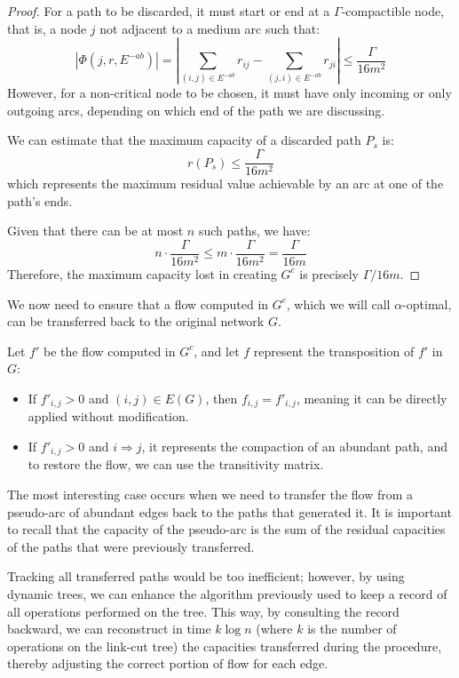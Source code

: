 \begin{proof}
    For a path to be discarded, it must start or end at a \(\Gamma\)-compactible node, that is, a node \( j \) not adjacent to a medium arc such that:
    \[
    |\Phi(j, r, E^{-ab})| = \left| \sum_{(i,j) \in E^{-ab}} r_{ij} - \sum_{(j,i) \in E^{-ab}} r_{ji} \right| \leq \frac{\Gamma}{16m^2}
    \]
    However, for a non-critical node to be chosen, it must have only incoming or only outgoing arcs, depending on which end of the path we are discussing.
    
    We can estimate that the maximum capacity of a discarded path \( P_s \) is:
    \[
    r(P_s) \leq \frac{\Gamma}{16m^2}
    \]
    which represents the maximum residual value achievable by an arc at one of the path's ends.
    
    Given that there can be at most \( n \) such paths, we have:
    \[
    n \cdot \frac{\Gamma}{16m^2} \leq m \cdot \frac{\Gamma}{16m^2} = \frac{\Gamma}{16m}
    \]
    Therefore, the maximum capacity lost in creating \( G^c \) is precisely \( \Gamma/16m \).
\end{proof}

We now need to ensure that a flow computed in \( G^c \), which we will call \(\alpha\)-optimal, can be transferred back to the original network \( G \).

Let \( f' \) be the flow computed in \( G^c \), and let \( f \) represent the transposition of \( f' \) in \( G \):
\begin{itemize}
    \item If \( f'_{i,j} > 0 \) and \( (i,j) \in E(G) \), then \( f_{i,j} = f'_{i,j} \), meaning it can be directly applied without modification.
    \item If \( f'_{i,j} > 0 \) and \( i \Rightarrow j \), it represents the compaction of an abundant path, and to restore the flow, we can use the transitivity matrix.
\end{itemize}

  
The most interesting case occurs when we need to transfer the flow from a pseudo-arc of abundant edges back to the paths that generated it. It is important to recall that the capacity of the pseudo-arc is the sum of the residual capacities of the paths that were previously transferred.

Tracking all transferred paths would be too inefficient; however, by using dynamic trees, we can enhance the algorithm previously used to keep a record of all operations performed on the tree. This way, by consulting the record backward, we can reconstruct in time \( k\log n \) (where \( k \) is the number of operations on the link-cut tree) the capacities transferred during the procedure, thereby adjusting the correct portion of flow for each edge.

